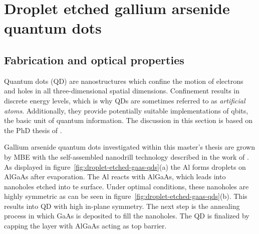 \chapter{Droplet etched gallium arsenide quantum dots}
\label{chapter:quantum-dot}

\section{Fabrication and optical properties}

Quantum dots (\acs{QD}) are nanostructures which confine the motion of electrons and holes in all three-dimensional spatial dimensions.
Confinement results in discrete energy levels, which is why \acp{QD} are sometimes referred to as \textit{artificial atoms}.
Additionally, they provide potentially suitable implementations of qbits, the basic unit of quantum information.
The discussion in this section is based on the PhD thesis of \textcite{huber_gaas_2019}.

Gallium arsenide quantum dots investigated within this master's thesis are grown by \ac{MBE} with the self-assembled nanodrill technology described in the work of \textcite{wang_nanoholes_2007}.
As displayed in figure~\ref{fig:droplet-etched-gaas-qds}(a) the \ac{Al} forms droplets on AlGaAs after evaporation.
The \ac{Al} reacts with AlGaAs, which leads into nanoholes etched into te surface.
Under optimal conditions, these nanoholes are highly symmetric as can be seen in figure~\ref{fig:droplet-etched-gaas-qds}(b). 
This results into \ac{QD} with high in-plane symmetry.
The next step is the annealing process in which \ac{GaAs} is deposited to fill the nanoholes.
The \ac{QD} is finalized by capping the layer with AlGaAs acting as top barrier.

